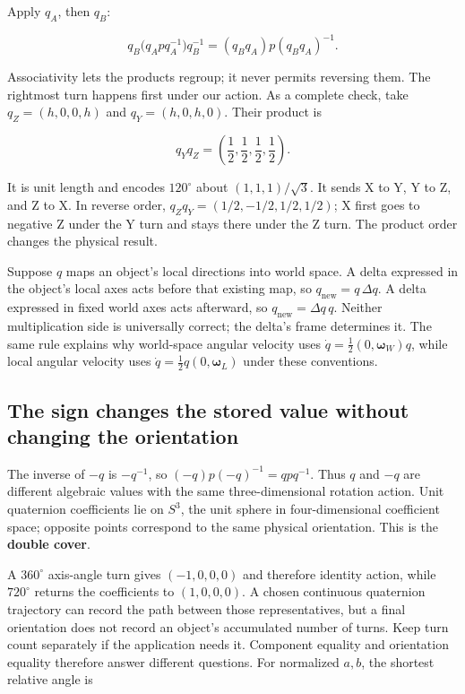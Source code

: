 Apply \(q_A\), then \(q_B\):

\[
q_B\bigl(q_Apq_A^{-1}\bigr)q_B^{-1}
=(q_Bq_A)p(q_Bq_A)^{-1}.
\]

Associativity lets the products regroup; it never permits reversing them. The rightmost turn happens first under our action. As a complete check, take \(q_Z=(h,0,0,h)\) and \(q_Y=(h,0,h,0)\). Their product is

\[
q_Yq_Z=\left(\frac12,\frac12,\frac12,\frac12\right).
\]

It is unit length and encodes \(120^\circ\) about \((1,1,1)/\sqrt3\). It sends X to Y, Y to Z, and Z to X. In reverse order, \(q_Zq_Y=(1/2,-1/2,1/2,1/2)\); X first goes to negative Z under the Y turn and stays there under the Z turn. The product order changes the physical result.

Suppose \(q\) maps an object's local directions into world space. A delta expressed in the object's local axes acts before that existing map, so \(q_{\mathrm{new}}=q\,\Delta q\). A delta expressed in fixed world axes acts afterward, so \(q_{\mathrm{new}}=\Delta q\,q\). Neither multiplication side is universally correct; the delta's frame determines it. The same rule explains why world-space angular velocity uses \(\dot q=\tfrac12(0,\boldsymbol\omega_W)q\), while local angular velocity uses \(\dot q=\tfrac12q(0,\boldsymbol\omega_L)\) under these conventions.

\subsection{The sign changes the stored value without changing the orientation}\label{01-foundations-i-ch019-the-sign-changes-the-stored-value-without-changing-the-orientation}

The inverse of \(-q\) is \(-q^{-1}\), so \((-q)p(-q)^{-1}=qpq^{-1}\). Thus \(q\) and \(-q\) are different algebraic values with the same three-dimensional rotation action. Unit quaternion coefficients lie on \(S^3\), the unit sphere in four-dimensional coefficient space; opposite points correspond to the same physical orientation. This is the \textbf{double cover}.

A \(360^\circ\) axis-angle turn gives \((-1,0,0,0)\) and therefore identity action, while \(720^\circ\) returns the coefficients to \((1,0,0,0)\). A chosen continuous quaternion trajectory can record the path between those representatives, but a final orientation does not record an object's accumulated number of turns. Keep turn count separately if the application needs it. Component equality and orientation equality therefore answer different questions. For normalized \(a,b\), the shortest relative angle is

